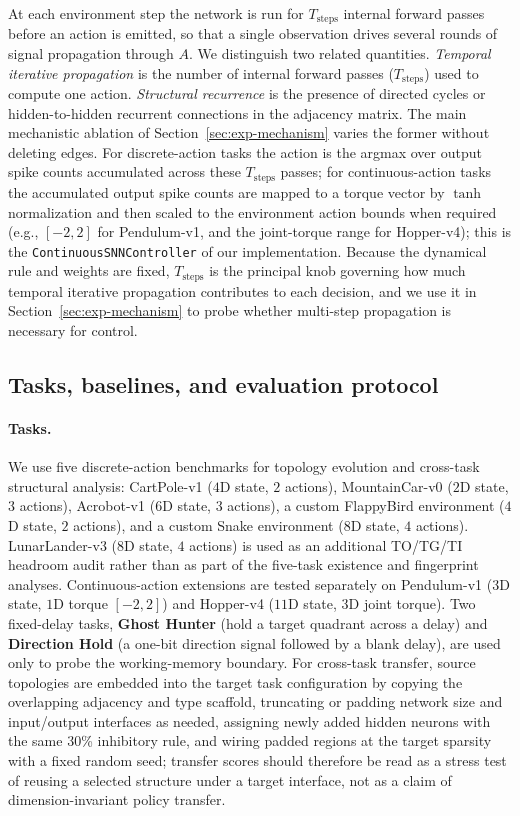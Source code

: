 \documentclass[10pt]{article}
\begin{document}
At each environment step the network is run for $T_\text{steps}$ internal forward
passes before an action is emitted, so that a single observation drives several
rounds of signal propagation through $A$. We distinguish two related quantities.
\emph{Temporal iterative propagation} is the number of internal forward passes
($T_\text{steps}$) used to compute one action. \emph{Structural recurrence} is the
presence of directed cycles or hidden-to-hidden recurrent connections in the
adjacency matrix. The main mechanistic ablation of Section~\ref{sec:exp-mechanism}
varies the former without deleting edges. For discrete-action tasks the action is
the argmax over output spike counts accumulated across these $T_\text{steps}$
passes; for continuous-action tasks the accumulated output spike counts are
mapped to a torque vector by $\tanh$ normalization and then scaled to the
environment action bounds when required (e.g., $[-2,2]$ for Pendulum-v1, and the
joint-torque range for Hopper-v4); this is the \texttt{ContinuousSNNController}
of our implementation. Because the dynamical rule and weights are fixed,
$T_\text{steps}$ is the principal knob governing how much temporal iterative
propagation contributes to each decision, and we use it in
Section~\ref{sec:exp-mechanism} to probe whether multi-step propagation is
necessary for control.

\subsection{Tasks, baselines, and evaluation protocol}
\label{sec:protocol}

\paragraph{Tasks.} We use five discrete-action benchmarks for topology evolution
and cross-task structural analysis: CartPole-v1 ($4$D state, $2$ actions),
MountainCar-v0 ($2$D state, $3$ actions), Acrobot-v1 ($6$D state, $3$ actions),
a custom FlappyBird environment ($4$D state, $2$ actions), and a custom Snake
environment ($8$D state, $4$ actions). LunarLander-v3 ($8$D state, $4$ actions)
is used as an additional TO/TG/TI headroom audit rather than as part of the
five-task existence and fingerprint analyses. Continuous-action extensions are tested
separately on Pendulum-v1 ($3$D state, $1$D torque $[-2,2]$) and Hopper-v4
($11$D state, $3$D joint torque). Two fixed-delay tasks, \textbf{Ghost Hunter}
(hold a target quadrant across a delay) and \textbf{Direction Hold} (a one-bit
direction signal followed by a blank delay), are used only to probe the
working-memory boundary. For cross-task transfer, source topologies are embedded
into the target task configuration by copying the overlapping adjacency and type
scaffold, truncating or padding network size and input/output interfaces as
needed, assigning newly added hidden neurons with the same 30\% inhibitory rule,
and wiring padded regions at the target sparsity with a fixed random seed;
transfer scores should therefore be read as a stress test of reusing a selected
structure under a target interface, not as a claim of dimension-invariant policy
transfer.
\end{document}
